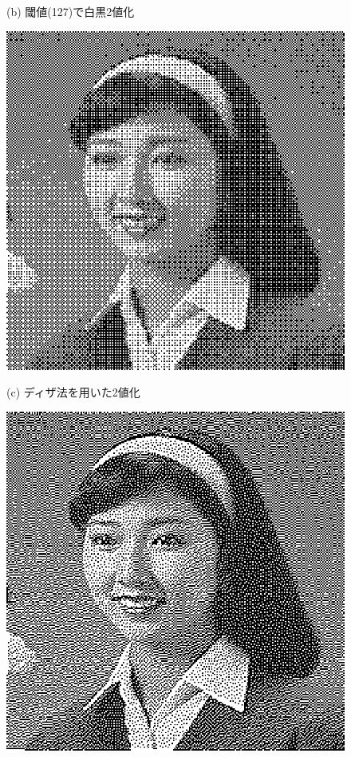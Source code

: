 \begin{figure}[H]
\begin{center}
\begin{minipage}{.4\textwidth}
\begin{center}
(b) 閾値(127)で白黒2値化
\end{center}
\end{minipage}
\begin{minipage}{.4\textwidth}
\begin{center}
\includegraphics[width=.95\textwidth]{fig/hair1_dither.eps}

(c) ディザ法を用いた2値化
\end{center}
\end{minipage}
\begin{minipage}{.4\textwidth}
\begin{center}
\includegraphics[width=.95\textwidth]{fig/hair1_ed.eps}


\end{center}
\end{minipage}
\end{center}
\end{figure}

